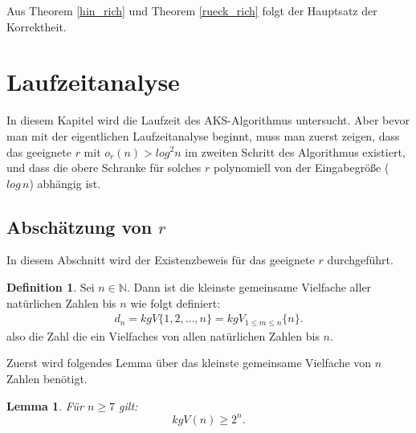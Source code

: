 \documentclass[12pt,oneside]{article}
\newtheorem{lemma}[theorem]{Lemma}
\theoremstyle{remark}
\theoremstyle{definition}
\newtheorem{definition}{Definition}[section]
\begin{document}
Aus Theorem \ref{hin_rich} und Theorem \ref{rueck_rich} folgt der Hauptsatz der Korrektheit.
\newpage
\section{Laufzeitanalyse}

In diesem Kapitel wird die Laufzeit des AKS-Algorithmus untersucht. Aber bevor man mit der eigentlichen Laufzeitanalyse beginnt, muss man zuerst zeigen, dass das geeignete $r$ mit $o_{r}(n) > log^2 n$ im zweiten Schritt des Algorithmus existiert, und dass die obere Schranke für solches $r$ polynomiell von der Eingabegröße ($log \, n$) abhängig ist.

\subsection{Abschätzung von $r$}
In diesem Abschnitt wird der Existenzbeweis für das geeignete $r$ durchgeführt.

\begin{definition}
Sei $n \in \mathbb{N}$. Dann ist die kleinste gemeinsame Vielfache aller natürlichen Zahlen bis $n$ wie folgt definiert:
\begin{align*}
    d_{n} = kgV\{1,2,\dots,n\} = kgV_{1 \leq m \leq n}{\{n\}}.
\end{align*}
also die Zahl die ein Vielfaches von allen natürlichen Zahlen bis $n$. 
\end{definition}

Zuerst wird folgendes Lemma über das kleinste gemeinsame Vielfache von $n$ Zahlen benötigt.

\begin{lemma}\label{lemma_1}
Für $n \geq 7$ gilt:\newline
\begin{equation}
    kgV(n) \geq 2^n.  
\end{equation}
\end{lemma}
\end{document}
